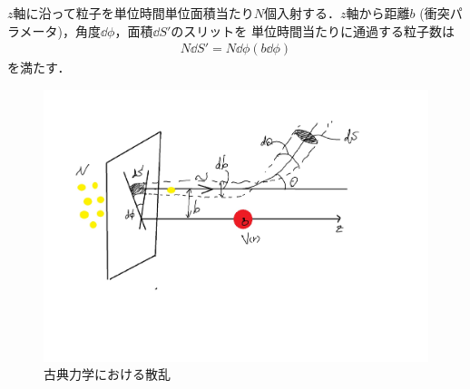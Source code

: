 \documentclass{report}
\begin{document}
  $z$軸に沿って粒子を単位時間単位面積当たり$N$個入射する．$z$軸から距離$b$ (衝突パラメータ)，角度$\dd{\phi}$，面積$\dd{S'}$のスリットを
  単位時間当たりに通過する粒子数は
  \begin{align}
    N\dd{S'} = N \dd{\phi} (b \dd{\phi})
  \end{align}
  を満たす．
  
  \begin{figure}[H]
    \centering
    \includegraphics[width=0.7\columnwidth]{fig/scattering_cm.pdf}
    \caption{古典力学における散乱}
    \label{sc-in-cm-image}
  \end{figure}
\end{document}
